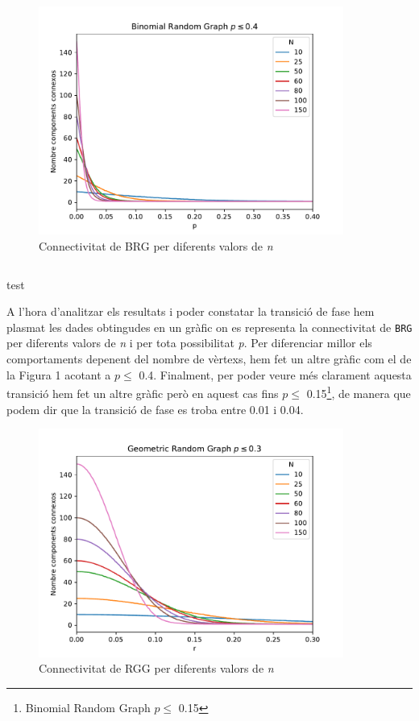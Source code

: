 \begin{figure}[H]
    \centering
    \includegraphics[width=10cm]{plots/bin_mult_2_04.pdf}
    \caption{Connectivitat de BRG per diferents valors de \textit{n}}
    \label{fig:connect_04}
\end{figure}

\begin{listing}
\inputminted{cpp}{src/graph.h}
\caption{test}
\end{listing}

A l'hora d'analitzar els resultats i poder constatar la transició de fase hem plasmat les dades obtingudes en un gràfic on es representa la connectivitat de \texttt{BRG} per diferents valors de \textit{n} i per tota possibilitat \textit{p}. Per diferenciar millor els comportaments depenent del nombre de vèrtexs, hem fet un altre gràfic com el de la Figura 1 acotant a $p\leq$ 0.4. Finalment, per poder veure més clarament aquesta transició hem fet un altre gràfic però en aquest cas fins $p\leq$ 0.15\footnote{Binomial Random Graph $p\leq$ 0.15}, de manera que podem dir que la transició de fase es troba entre 0.01 i 0.04.

\begin{figure}[H]
    \centering
    \includegraphics[width=10cm]{plots/geo_mult_2_03.pdf}
    \caption{Connectivitat de RGG per diferents valors de \textit{n}}
    \label{fig:connect_04}
\end{figure}

